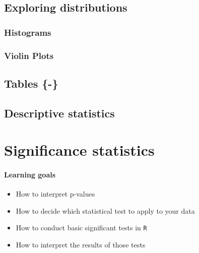 \documentclass[
]{book}
\providecommand{\tightlist}{%
  \setlength{\itemsep}{0pt}\setlength{\parskip}{0pt}}
\begin{document}
\hypertarget{exploring-distributions}{%
\section*{Exploring distributions}\label{exploring-distributions}}

\hypertarget{histograms}{%
\subsection*{Histograms}\label{histograms}}

\hypertarget{violin-plots}{%
\subsection*{Violin Plots}\label{violin-plots}}

\hypertarget{tables}{%
\section{Tables \{-\}}\label{tables}}

\hypertarget{descriptive-statistics}{%
\section*{Descriptive statistics}\label{descriptive-statistics}}

\hypertarget{significance-statistics}{%
\chapter{Significance statistics}\label{significance-statistics}}

\hypertarget{learning-goals-11}{%
\subsubsection*{Learning goals}\label{learning-goals-11}}

\begin{itemize}
\tightlist
\item
  How to interpret p-values\\
\item
  How to decide which statistical test to apply to your data
\item
  How to conduct basic significant tests in \texttt{R}
\item
  How to interpret the results of those tests
\end{itemize}
\end{document}
